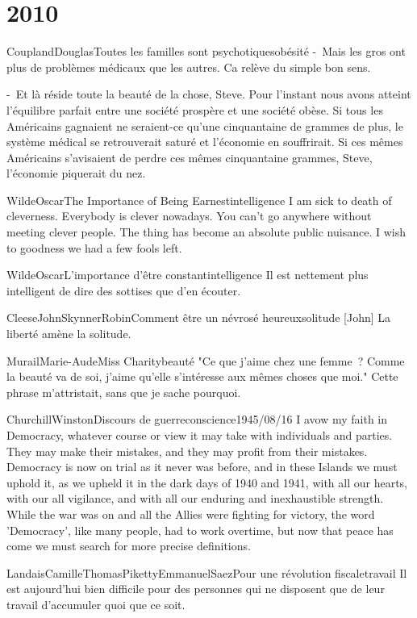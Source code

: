 \chapter{2010}

\begin{xcit}{Coupland}{Douglas}{Toutes les familles sont psychotiques}{obésité}
-~Mais les gros ont plus de problèmes médicaux que les autres. Ca relève du simple bon sens.

-~Et là réside toute la beauté de la chose, Steve. Pour l'instant nous avons atteint l'équilibre parfait entre une société prospère et une société obèse. Si tous les Américains gagnaient ne seraient-ce qu'une cinquantaine de grammes de plus, le système médical se retrouverait saturé et l'économie en souffrirait. Si ces mêmes Américains s'avisaient de perdre ces mêmes cinquantaine grammes, Steve, l'économie piquerait du nez.
\end{xcit}

\begin{xcit}{Wilde}{Oscar}{The Importance of Being Earnest}{intelligence}
I am sick to death of cleverness.  Everybody is clever nowadays.  You can't go anywhere without meeting clever people.  The thing has become an absolute public nuisance.  I wish to goodness we had a few fools left.
\end{xcit}

\begin{xcit}{Wilde}{Oscar}{L'importance d'être constant}{intelligence}
Il est nettement plus intelligent de dire des sottises que d'en écouter.
\end{xcit}

\begin{xcita}{Cleese}{John}{Skynner}{Robin}{Comment être un névrosé heureux}{solitude}
[John] La liberté amène la solitude.
\end{xcita}

\begin{xcitenfant}{Murail}{Marie-Aude}{Miss Charity}{beauté} 
"Ce que j'aime chez une femme~? Comme la beauté va de soi, j'aime qu'elle s'intéresse aux mêmes choses que moi." Cette phrase m'attristait, sans que je sache pourquoi.
\end{xcitenfant}

\begin{xcitw}{Churchill}{Winston}{Discours de guerre}{conscience}{1945/08/16}
I avow my faith in Democracy, whatever course or view it may take with individuals and parties. They may make their mistakes, and they may profit from their mistakes. Democracy is now on trial as it never was before, and in these Islands we must uphold it, as we upheld it in the dark days of 1940 and 1941, with all our hearts, with our all vigilance, and with all our enduring and inexhaustible strength. While the war was on and all the Allies were fighting for victory, the word 'Democracy', like many people, had to work overtime, but now that peace has come we must search for more precise definitions.
\end{xcitw}

\begin{xcita3}{Landais}{Camille}{Thomas}{Piketty}{Emmanuel}{Saez}{Pour une révolution fiscale}{travail}
Il est aujourd'hui bien difficile pour des personnes qui ne disposent que de leur travail d'accumuler quoi que ce soit.
\end{xcita3}
